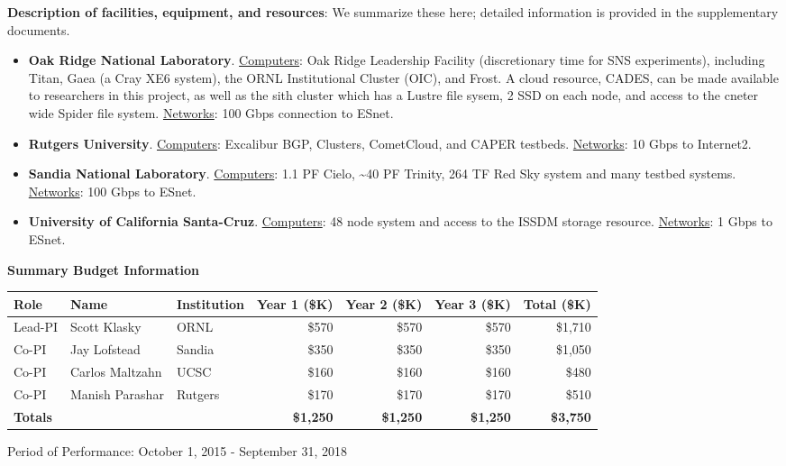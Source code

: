 \vspace{2ex}

\noindent
{\bf Description of facilities, equipment, and resources}: We summarize these here; detailed information is provided in the supplementary documents.
\begin{itemize}[itemsep=1pt,topsep=2pt]
\item
{\bf Oak Ridge National Laboratory}. \underline{Computers}:
Oak Ridge Leadership Facility (discretionary time for SNS experiments), including
Titan, Gaea (a Cray XE6 system), the ORNL Institutional Cluster (OIC),
and Frost. A cloud resource, CADES, can be made available to
researchers in this project, as well as the sith cluster which has a Lustre file
sysem, 2 SSD on each node, and access to the cneter wide Spider file system.
 \underline{Networks}: 100 Gbps connection to ESnet.
\vspace{-1ex}
\item
{\bf Rutgers University}. \underline{Computers}: Excalibur BGP, Clusters, CometCloud, and CAPER testbeds. \underline{Networks}: 10 Gbps to Internet2.
\vspace{-1ex}
\item
{\bf Sandia National Laboratory}.
\underline{Computers}: 1.1 PF Cielo, {\textasciitilde}40 PF Trinity, 264 TF Red Sky system and many testbed systems.
\underline{Networks}: 100 Gbps to ESnet.
\item
{\bf University of California Santa-Cruz}.
\underline{Computers}:  48 node system and access to the ISSDM storage resource.
\underline{Networks}: 1 Gbps to ESnet.
\end{itemize}

\begin{center}
\textbf{\large Summary Budget Information}
\medskip
\begin{tabular}{| l | l | l | r | r | r | r |} \hline
Role & Name & Institution & Year 1 (\$K) & Year 2 (\$K) &   Year 3 (\$K) & Total (\$K) \\
\hline
Lead-PI & Scott Klasky & ORNL & {\$}570 &  {\$}570 &  {\$}570 &   {\$}1,710\\
Co-PI & Jay Lofstead & Sandia  &  {\$}350 &  {\$}350 &  {\$}350 &  {\$}1,050 \\
Co-PI & Carlos  Maltzahn & UCSC  &  {\$}160 &  {\$}160 &  {\$}160 &  {\$}480 \\
Co-PI & Manish Parashar & Rutgers &  {\$}170 &  {\$}170 &  {\$}170 &  {\$}510  \\
\hline
{\bf Totals}  & & & {\bf  {\$}1,250} & {\bf  {\$}1,250} & {\bf  {\$}1,250} & {\bf  {\$}3,750}\\
\hline
\end{tabular}
\end{center}

\noindent
{Period of Performance: October 1, 2015 - September 31, 2018}\\
\noindent
\vfill

